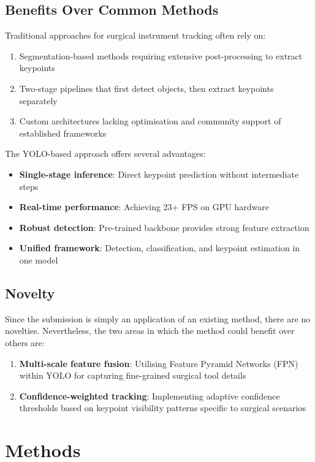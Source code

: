 \documentclass[11pt]{article}
\begin{document}
\subsection{Benefits Over Common Methods}

Traditional approaches for surgical instrument tracking often rely on:
\begin{enumerate}[noitemsep]
    \item Segmentation-based methods requiring extensive post-processing to extract keypoints
    \item Two-stage pipelines that first detect objects, then extract keypoints separately
    \item Custom architectures lacking optimisation and community support of established frameworks
\end{enumerate}

\noindent The YOLO-based approach offers several advantages:
\begin{itemize}[noitemsep]
    \item \textbf{Single-stage inference}: Direct keypoint prediction without intermediate steps
    \item \textbf{Real-time performance}: Achieving 23+ FPS on GPU hardware
    \item \textbf{Robust detection}: Pre-trained backbone provides strong feature extraction
    \item \textbf{Unified framework}: Detection, classification, and keypoint estimation in one model
\end{itemize}

\subsection{Novelty}

Since the submission is simply an application of an existing method, there are no novelties. Nevertheless, the two areas in which the method could benefit over others are: 
\begin{enumerate}[noitemsep]
    \item \textbf{Multi-scale feature fusion}: Utilising Feature Pyramid Networks (FPN) within YOLO for capturing fine-grained surgical tool details
    \item \textbf{Confidence-weighted tracking}: Implementing adaptive confidence thresholds based on keypoint visibility patterns specific to surgical scenarios
\end{enumerate}

\section{Methods}
\end{document}
